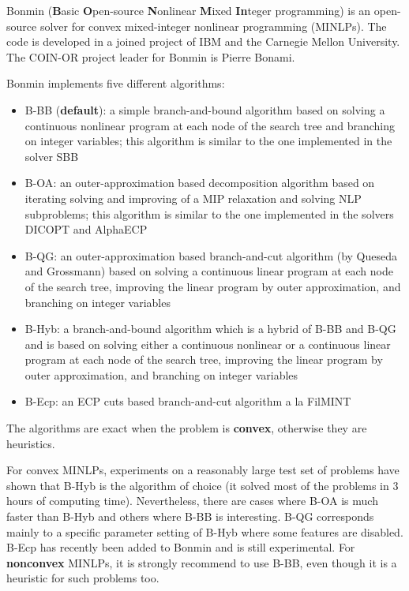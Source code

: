 Bonmin (\textbf{B}asic \textbf{O}pen-source \textbf{N}onlinear \textbf{M}ixed \textbf{In}teger programming) is an open-source solver for convex mixed-integer nonlinear programming (MINLPs).
The code is developed in a joined project of IBM and the Carnegie Mellon University.
The COIN-OR project leader for Bonmin is Pierre Bonami.

Bonmin implements five different algorithms:
\begin{itemize}
\item {B-BB} (\textbf{default}): a simple branch-and-bound algorithm based on solving a continuous nonlinear program at each node of the search tree and branching on integer variables; this algorithm is similar to the one implemented in the solver SBB
\item {B-OA}: an outer-approximation based decomposition algorithm based on iterating solving and improving of a MIP relaxation and solving NLP subproblems; this algorithm is similar to the one implemented in the solvers DICOPT and AlphaECP
\item {B-QG}: an outer-approximation based branch-and-cut algorithm (by Queseda and Grossmann) based on solving a continuous linear program at each node of the search tree, improving the linear program by outer approximation, and branching on integer variables
\item {B-Hyb}: a branch-and-bound algorithm which is a hybrid of B-BB and B-QG and is based on solving either a continuous nonlinear or a continuous linear program at each node of the search tree, improving the linear program by outer approximation, and branching on integer variables
\item {B-Ecp}: an ECP cuts based branch-and-cut algorithm a la FilMINT
\end{itemize}
The algorithms are exact when the problem is \textbf{convex}, otherwise they are heuristics.

For convex MINLPs, experiments on a reasonably large test set of problems have shown that B-Hyb is the algorithm of choice (it solved most of the problems in 3 hours of computing time).
Nevertheless, there are cases where B-OA is much faster than B-Hyb and others where B-BB is interesting.
B-QG corresponds mainly to a specific parameter setting of B-Hyb where some features are disabled.
B-Ecp has recently been added to Bonmin and is still experimental.
For \textbf{nonconvex} MINLPs, it is strongly recommend to use B-BB, even though it is a heuristic for such problems too.

